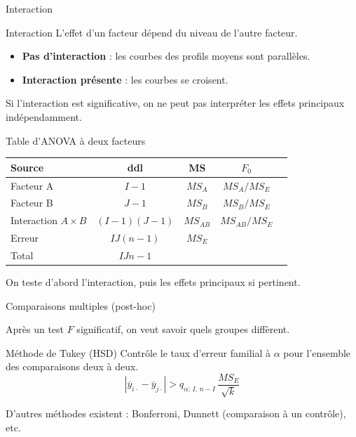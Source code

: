 \documentclass{BeamerTemplate}
\begin{document}
\begin{frame}[t]{Interaction}

\begin{Boite}{Interaction}
L'effet d'un facteur dépend du niveau de l'autre facteur.
\end{Boite}

\medskip
\begin{itemize}\itemsep5mm
  \item \textbf{Pas d'interaction} : les courbes des profils moyens sont parallèles.
  \item \textbf{Interaction présente} : les courbes se croisent.
\end{itemize}

\bigskip
Si l'interaction est significative, on ne peut pas interpréter les effets principaux indépendamment.

\end{frame}

\begin{frame}[t]{Table d'ANOVA à deux facteurs}

\begin{center}
\small
\begin{tabular}{lcccc}\hline
\textbf{Source} & \textbf{ddl} & \textbf{MS} & \textbf{$F_0$} \\ \hline
Facteur A & $I-1$ & $MS_A$ & $MS_A/MS_E$ \\[3pt]
Facteur B & $J-1$ & $MS_B$ & $MS_B/MS_E$ \\[3pt]
Interaction $A \times B$ & $(I-1)(J-1)$ & $MS_{AB}$ & $MS_{AB}/MS_E$ \\[3pt]
Erreur & $IJ(n-1)$ & $MS_E$ & \\[3pt]
Total & $IJn-1$ & & \\ \hline
\end{tabular}
\end{center}

\medskip
On teste d'abord l'interaction, puis les effets principaux si pertinent.

\end{frame}

\begin{frame}[t]{Comparaisons multiples (post-hoc)}

Après un test $F$ significatif, on veut savoir \alert{quels groupes diffèrent}.

\bigskip
\begin{Boite}{Méthode de Tukey (HSD)}
Contrôle le taux d'erreur familial à $\alpha$ pour l'ensemble des comparaisons deux à deux.
$$|\overline{y}_{i\cdot} - \overline{y}_{j\cdot}| > q_{\alpha;\,I,\,n-I}\,\frac{MS_E}{\sqrt{k}}$$
\end{Boite}

\medskip
D'autres méthodes existent : Bonferroni, Dunnett (comparaison à un contrôle), etc.

\end{frame}
\end{document}
